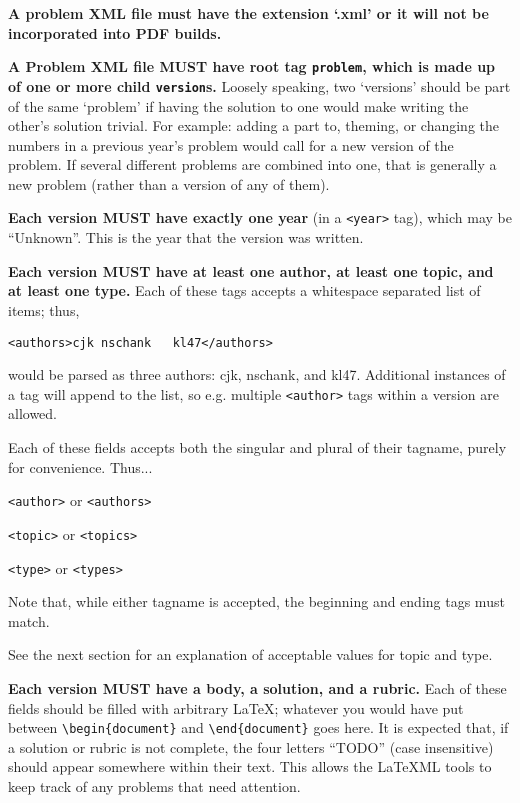 {    \textbf{A problem XML file must have the extension `.xml' or it will not be incorporated into PDF builds.}
    
    \textbf{A Problem XML file MUST have root tag \texttt{problem}, which is made up of one or more child \texttt{version}s.} Loosely speaking, two `versions' should be part of the same `problem' if having the solution to one would make writing the other's solution trivial. For example: adding a part to, theming, or changing the numbers in a previous year's problem would call for a new version of the problem. If several different problems are combined into one, that is generally a new problem (rather than a version of any of them).
    
    \textbf{Each version MUST have exactly one year} (in a \texttt{<year>} tag), which may be ``Unknown''. This is the year that the version was written.
    
    \textbf{Each version MUST have at least one author, at least one topic, and at least one type.} Each of these tags accepts a whitespace separated list of items; thus,
    \begin{center}
      \texttt{<authors>cjk nschank\ \ \ kl47</authors>}
    \end{center}
    would be parsed as three authors: cjk, nschank, and kl47. Additional instances of a tag will append to the list, so e.g. multiple \texttt{<author>} tags within a version are allowed.
    
    Each of these fields accepts both the singular and plural of their tagname, purely for convenience. Thus...
    \begin{description}\itemsep0pt
      \item[Authors] \texttt{<author>} or \texttt{<authors>}
      \item[Topic] \texttt{<topic>} or \texttt{<topics>}
      \item[Type] \texttt{<type>} or \texttt{<types>}
    \end{description}
    
    Note that, while either tagname is accepted, the beginning and ending tags must match.
    
    See the next section for an explanation of acceptable values for topic and type.
    
    \textbf{Each version MUST have a body, a solution, and a rubric.} Each of these fields should be filled with arbitrary \LaTeX; whatever you would have put between \texttt{\textbackslash begin\{document\}} and \texttt{\textbackslash end\{document\}} goes here. It is expected that, if a solution or rubric is not complete, the four letters ``TODO'' (case insensitive) should appear somewhere within their text. This allows the \LaTeX ML tools to keep track of any problems that need attention.
    
}
